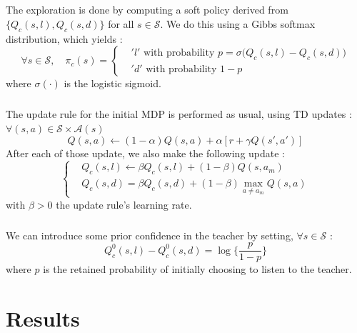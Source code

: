 \documentclass[a4paper]{report}
\begin{document}
{{{{			\paragraph{} The exploration is done by computing a soft policy derived from $\{Q_c(s,l), Q_c(s,d)\}$ for all $s\in\mathcal{S}$. We do this using a Gibbs softmax distribution, which yields : 
			\begin{equation}
				\forall s \in\mathcal{S}, \quad \pi_c(s) = 
					\left\{
						\begin{aligned}
							&'l' \text{ with probability } p=\sigma\big(Q_c(s,l) - Q_c(s,d) \big) \\
							& 'd'  \text{ with probability } 1-p
						\end{aligned}
					\right.
			\end{equation}
			where $\sigma(\cdot)$ is the logistic sigmoid. 
			
			\paragraph{} The update rule for the initial MDP is performed as usual, using TD updates : $\forall{(s,a)}\in\mathcal{S}\times\mathcal{A}(s)$
			\begin{equation}
				Q(s,a) \leftarrow (1-\alpha)Q(s,a) + \alpha \left[ r + \gamma Q(s',a')\right]
			\end{equation}
			After each of those update, we also make the following update : 
			\begin{equation}
				\left\{
				\begin{aligned}
					&Q_c(s,l) \leftarrow  \beta Q_c(s,l) + (1-\beta)Q(s,a_m) \\
					&Q_c(s,d) = \beta Q_c(s,d) + (1-\beta)\max_{a\neq a_m} Q(s,a) 
				\end{aligned}
				\right.
			\end{equation}
			with $\beta >0$ the update rule's learning rate. 
			\paragraph{} We can introduce some prior confidence in the teacher by setting, $\forall s\in\mathcal{S}$ : 
			\begin{equation}
				Q^0_c(s,l) - Q^0_c(s,d) = \log\{\frac{p}{1-p}\}
			\end{equation}
			where $p$ is the retained probability of initially choosing to listen to the teacher. 
			}
		}	
	}
	
	\chapter{Results}
	{
		\label{chap::res}
	
}}
\end{document}
